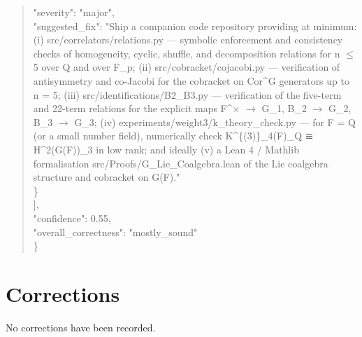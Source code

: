 \documentclass[11pt]{article}
\begin{document}
\begin{quote}
      "severity": "major",\\
      "suggested\_fix": "Ship a companion code repository providing at minimum: (i) src/correlators/relations.py --- symbolic enforcement and consistency checks of homogeneity, cyclic, shuffle, and decomposition relations for n \ensuremath{\le} 5 over Q and over F\_p; (ii) src/cobracket/cojacobi.py --- verification of antisymmetry and co-Jacobi for the cobracket on Cor\^{}G generators up to n = 5; (iii) src/identifications/B2\_B3.py --- verification of the five-term and 22-term relations for the explicit maps F\^{}\ensuremath{\times} \ensuremath{\to} G\_1, B\_2 \ensuremath{\to} G\_2, B\_3 \ensuremath{\to} G\_3; (iv) experiments/weight3/k\_theory\_check.py --- for F = Q (or a small number field), numerically check K\^{}\{(3)\}\_4(F)\_Q ≅ H\^{}2(G(F))\_3 in low rank; and ideally (v) a Lean 4 / Mathlib formalisation src/Proofs/G\_Lie\_Coalgebra.lean of the Lie coalgebra structure and cobracket on G(F)."\\
    \}\\
  ],\\
  "confidence": 0.55,\\
  "overall\_correctness": "mostly\_sound"\\
\}\\
\end{quote}

\section*{Corrections}
No corrections have been recorded.
\end{document}
